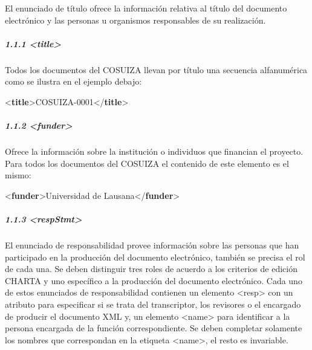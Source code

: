 \documentclass[
]{book}
\newenvironment{Shaded}{\begin{snugshade}}{\end{snugshade}}
\newcommand{\KeywordTok}[1]{\textcolor[rgb]{0.13,0.29,0.53}{\textbf{#1}}}
\newcommand{\NormalTok}[1]{#1}
\begin{document}
El enunciado de título ofrece la información relativa al título del documento electrónico y las personas u organismos responsables de su realización.

\hypertarget{title}{%
\subparagraph*{\texorpdfstring{ 1.1.1 { \textless title\textgreater{} }}{ 1.1.1  \textless title\textgreater{} }}\label{title}}

Todos los documentos del COSUIZA llevan por título una secuencia alfanumérica como se ilustra en el ejemplo debajo:

\begin{Shaded}
\begin{Highlighting}[]
\NormalTok{\textless{}}\KeywordTok{title}\NormalTok{\textgreater{}COSUIZA{-}0001\textless{}/}\KeywordTok{title}\NormalTok{\textgreater{}}
\end{Highlighting}
\end{Shaded}

\hypertarget{funder}{%
\subparagraph*{\texorpdfstring{1.1.2 { \textless funder\textgreater{} }}{1.1.2  \textless funder\textgreater{} }}\label{funder}}

Ofrece la información sobre la institución o individuos que financian el proyecto. Para todos los documentos del COSUIZA el contenido de este elemento es el mismo:

\begin{Shaded}
\begin{Highlighting}[]
\NormalTok{\textless{}}\KeywordTok{funder}\NormalTok{\textgreater{}Universidad de Lausana\textless{}/}\KeywordTok{funder}\NormalTok{\textgreater{}}
\end{Highlighting}
\end{Shaded}

\hypertarget{respstmt}{%
\subparagraph*{\texorpdfstring{1.1.3 { \textless respStmt\textgreater{} }}{1.1.3  \textless respStmt\textgreater{} }}\label{respstmt}}

El enunciado de responsabilidad provee información sobre las personas que han participado en la producción del documento electrónico, también se precisa el rol de cada una. Se deben distinguir tres roles de acuerdo a los criterios de edición CHARTA y uno específico a la producción del documento electrónico. Cada uno de estos enunciados de responsabilidad contienen un elemento {\textless resp\textgreater{}} con un atributo para especificar si se trata del transcriptor, los revisores o el encargado de producir el documento XML y, un elemento {\textless name\textgreater{}} para identificar a la persona encargada de la función correspondiente. Se deben completar solamente los nombres que correspondan en la etiqueta {\textless name\textgreater{}}, el resto es invariable.
\end{document}
